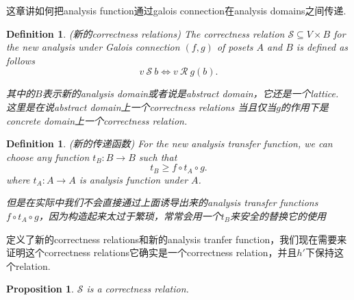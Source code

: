 \documentclass{article}
\newtheorem{proposition}[theorem]{Proposition}
\newtheorem{definition}[theorem]{Definition}
\newcommand*{\xfunc}[4]{{#2}\colon{#3}{#1}{#4}}
\newcommand*{\func}[3]{\xfunc{\to}{#1}{#2}{#3}}
\begin{document}
{\color{red} 这章讲如何把analysis function通过galois connection在analysis domains之间传递}.

\begin{definition}
\rm {\color{red}(新的correctness relations)} The correctness relation $\mathcal{S} \subseteq V \times B$ for the new analysis under Galois connection $(f,g)$ of posets $A$ and $B$ is defined as follows
$$
v~\mathcal{S}~b \iff v~\mathcal{R}~g(b).
$$

{\color{red} 其中的$B$表示新的analysis domain或者说是abstract domain，它还是一个lattice}. {\color{blue} 这里是在说abstract domain上一个correctness relations 当且仅当$g$的作用下是concrete domain上一个correctness relation}.
\end{definition}


\begin{definition}
\rm {\color{red} (新的传递函数)} For the new analysis transfer function, we can choose any function $\func{t_B}{B}{B}$ such that
$$
t_B \geq f \circ t_A \circ g.
$$
where $\func{t_A}{A}{A}$ is analysis function under $A$.
\begin{center}
\end{center}
{\color{blue} 但是在实际中我们不会直接通过上面诱导出来的analysis transfer functions $f \circ t_A \circ g$，因为构造起来太过于繁琐，常常会用一个$t_B$来安全的替换它的使用}
\end{definition}



{\color{red} 定义了新的correctness relations和新的analysis tranfer function，我们现在需要来证明这个correctness relations它确实是一个correctness relation，并且$h'$下保持这个relation}.

\begin{proposition}
\rm $\mathcal{S}$ is a correctness relation.
\end{proposition}
\end{document}
